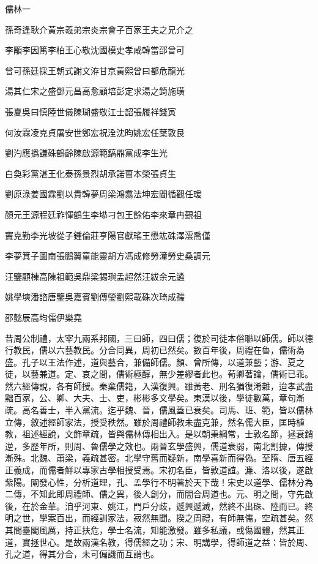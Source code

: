 
\begin{pinyinscope}
儒林一

孫奇逢耿介黃宗羲弟宗炎宗會子百家王夫之兄介之

李顒李因篤李柏王心敬沈國模史孝咸韓當邵曾可

曾可孫廷採王朝式謝文洊甘京黃熙曾曰都危龍光

湯其仁宋之盛鄧元昌高愈顧培彭定求湯之錡施璜

張夏吳曰慎陸世儀陳瑚盛敬江士韶張履祥錢寅

何汝霖凌克貞屠安世鄭宏祝洤沈昀姚宏任葉敦艮

劉汋應撝謙硃鶴齡陳啟源範鎬鼎黨成李生光

白奐彩黨湛王化泰孫景烈胡承諾曹本榮張貞生

劉原淥姜國霖劉以貴韓夢周梁鴻翥法坤宏閻循觀任瑗

顏元王源程廷祚惲鶴生李塨刁包王餘佑李來章冉覲祖

竇克勤李光坡從子鍾倫莊亨陽官獻瑤王懋竑硃澤澐喬僅

李夢箕子圖南張鵬翼童能靈胡方馮成修勞潼勞史桑調元

汪鑒顧棟高陳祖範吳鼎梁錫璵孟超然汪紱余元遴

姚學塽潘諮唐鑒吳嘉賓劉傳瑩劉熙載硃次琦成孺

邵懿辰高均儒伊樂堯

昔周公制禮，太宰九兩系邦國，三曰師，四曰儒；復於司徒本俗聯以師儒。師以德行教民，儒以六藝教民。分合同異，周初已然矣。數百年後，周禮在魯，儒術為盛。孔子以王法作述，道與藝合，兼備師儒。顏、曾所傳，以道兼藝；游、夏之徒，以藝兼道。定、哀之間，儒術極醇，無少差繆者此也。荀卿著論，儒術已乖。然六經傳說，各有師授。秦棄儒籍，入漢復興。雖黃老、刑名猶復淆雜，迨孝武盡黜百家，公、卿、大夫、士、吏，彬彬多文學矣。東漢以後，學徒數萬，章句漸疏。高名善士，半入黨流。迄乎魏、晉，儒風蓋已衰矣。司馬、班、範，皆以儒林立傳，敘述經師家法，授受秩然。雖於周禮師教未盡克兼，然名儒大臣，匡時植教，祖述經說，文飾章疏，皆與儒林傳相出入。是以朝秉綱常，士敦名節，拯衰銷逆，多歷年所，則周、魯儒學之效也。兩晉玄學盛興，儒道衰弱，南北割據，傳授漸殊。北魏、蕭梁，義疏甚密。北學守舊而疑新，南學喜新而得偽。至隋、唐五經正義成，而儒者鮮以專家古學相授受焉。宋初名臣，皆敦道誼。濂、洛以後，遂啟紫陽。闡發心性，分析道理，孔、孟學行不明著於天下哉！宋史以道學、儒林分為二傳，不知此即周禮師、儒之異，後人創分，而闇合周道也。元、明之間，守先啟後，在於金華。洎乎河東、姚江，門戶分歧，遞興遞滅，然終不出硃、陸而已。終明之世，學案百出，而經訓家法，寂然無聞。揆之周禮，有師無儒，空疏甚矣。然其間臺閣風厲，持正扶危，學士名流，知能激發。雖多私議，或傷國體，然其正道，實拯世心。是故兩漢名教，得儒經之功；宋、明講學，得師道之益：皆於周、孔之道，得其分合，未可偏譏而互誚也。


\end{pinyinscope}
